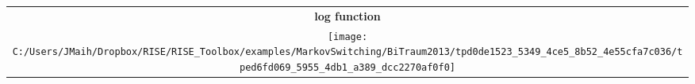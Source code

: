 \documentclass[12pt,landscape]{article}
\numberwithin{equation}{section}
\begin{document}
 
\pagestyle{myheadings} 

\pagebreak 
  
\begin{tabular}[H]{@{\hspace*{-3pt}}c@{}} 
\multicolumn{1}{c}{\large\bfseries log function}\\ 
\centerline{\texttt{[image: C:/Users/JMaih/Dropbox/RISE/RISE\_Toolbox/examples/MarkovSwitching/BiTraum2013/tpd0de1523\_5349\_4ce5\_8b52\_4e55cfa7c036/tped6fd069\_5955\_4db1\_a389\_dcc2270af0f0]}} 
\end{tabular} 
  
\pagebreak 
  
\end{document}
